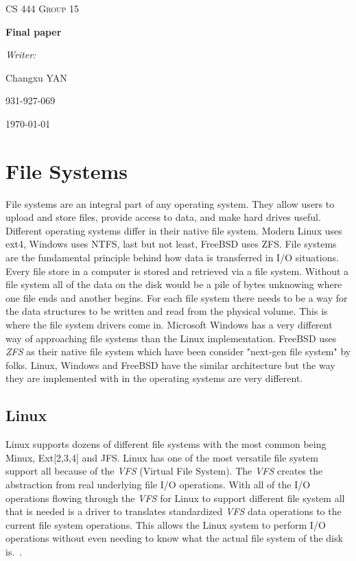\documentclass[10pt,draftclsnofoot,onecolumn,journal,compsoc]{IEEEtran}
\begin{document}
\begin{titlepage}
\begin{center}
    \vfill
    \textsc{\LARGE CS 444 Group 15}\par
    \vspace{1cm}
    { \huge \bfseries Final paper \par}
    \vfill
    \emph{Writer:}\par
    Changxu \textsc{YAN}\par
    \vspace{1cm}
    931-927-069 \par
    \vfill
    {\large \today\par}
\end{center}

\end{titlepage}

\section{File Systems}
File systems are an integral part of any operating system. They allow users to upload and store files, provide access to data, and make hard drives useful. Different operating systems differ in their native file system. Modern Linux uses ext4, Windows uses NTFS, last but not least, FreeBSD uses ZFS. File systems are the fundamental principle behind how data is transferred in I/O situations. Every file store in a computer is stored and retrieved via a file system. Without a file system all of the data on the disk would be a pile of bytes unknowing where one file ends and another begins. For each file system there needs to be a way for the data structures to be written and read from the physical volume. This is where the file system drivers come in. Microsoft Windows has a very different way of approaching file systems than the Linux implementation. FreeBSD uses \textit{ZFS} as their native file system which have been consider "next-gen file system" by folks. Linux, Windows and FreeBSD have the similar architecture but the way they are implemented with in the operating systems are very different.

\subsection*{Linux} 
Linux supports dozens of different file systems with the most common being Minux, Ext[2,3,4] and JFS. Linux has one of the most versatile file system support all because of the \textit{VFS} (Virtual File System). The \textit{VFS} creates the abstraction from real underlying file I/O operations. With all of the I/O operations flowing through the \textit{VFS} for Linux to support different file system all that is needed is a driver to translates standardized \textit{VFS} data operations to the current file system operations. This allows the Linux system to perform I/O operations without even needing to know what the actual file system of the disk is.~\cite{Love}.
\end{document}
